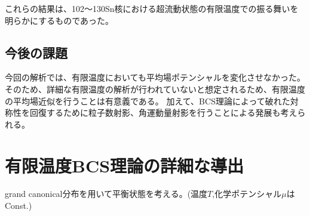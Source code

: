 \documentclass[a4paper]{jsreport}
\begin{document}
  これらの結果は、102〜130Sn核における超流動状態の有限温度での振る舞いを明らかにするものであった。
  \section{今後の課題}
  今回の解析では、有限温度においても平均場ポテンシャルを変化させなかった。
  そのため、詳細な有限温度の解析が行われていないと想定されるため、有限温度の平均場近似を行うことは有意義である。
  加えて、BCS理論によって破れた対称性を回復するために粒子数射影、角運動量射影を行うことによる発展も考えられる。



\appendix
\chapter{有限温度BCS理論の詳細な導出}\label{FTBCS導出}
  grand canonical分布を用いて平衡状態を考える。(温度$T$,化学ポテンシャル$\mu$はConst.)
  
\end{document}
